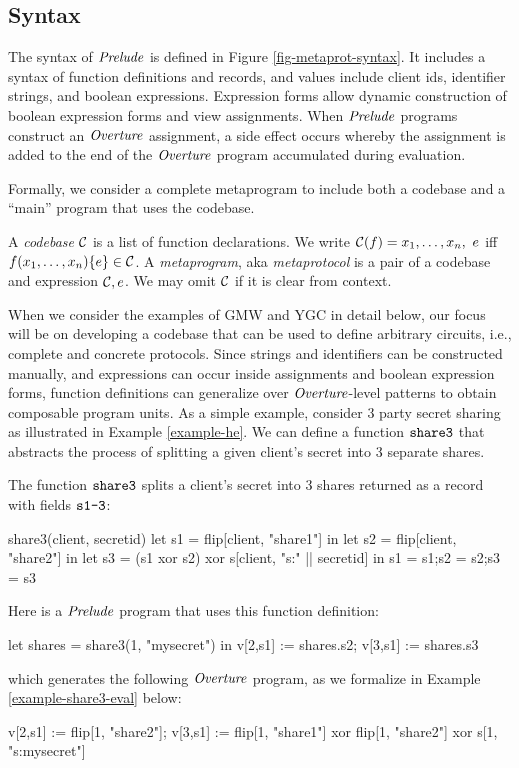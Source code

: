 \subsection{Syntax}

The syntax of $\mathit{Prelude}$ is defined in Figure
\ref{fig-metaprot-syntax}.  It includes a syntax of function
definitions and records, and values include client ids, identifier
strings, and boolean expressions. Expression forms allow dynamic
construction of boolean expression forms and view assignments. When
$\mathit{Prelude}$ programs construct an $\mathit{Overture}$ assignment, a side effect
occurs whereby the assignment is added to the end of the $\mathit{Overture}$
program accumulated during evaluation.

Formally, we consider a complete metaprogram to include both a
codebase and a ``main'' program that uses the codebase. 
\begin{definition}
A \emph{codebase} $\mathcal{C}$ is a list of function 
declarations. We write $ \mathcal{C}(f) = x_1,\ldots,x_n,\ e$
iff $f(x_1,\ldots,x_n) \{ e \} \in \mathcal{C}$.
A \emph{metaprogram}, aka \emph{metaprotocol}  is a pair of a 
codebase and expression $\mathcal{C}, e$. We may omit
$\mathcal{C}$ if it is clear from context.  
\end{definition}

When we consider the examples of GMW and YGC in detail below, our
focus will be on developing a codebase that can be used to define
arbitrary circuits, i.e., complete and concrete protocols. Since
strings and identifiers can be constructed manually, and expressions
can occur inside assignments and boolean expression forms, function
definitions can generalize over $\mathit{Overture}$-level patterns to obtain
composable program units.   As a simple example, consider 3 party secret sharing as
illustrated in Example \ref{example-he}. We can define a function
$\texttt{share3}$ that abstracts the process of splitting a given
client's secret into 3 separate shares.
\begin{example} \label{example-share3} The function $\texttt{share3}$ 
  splits a client's secret into 3 shares returned as a record
  with fields $\texttt{s1-3}$:
  {\small
  \begin{verbatimtab}
      share3(client, secretid) {
        let s1 = flip[client, "share1"] in
        let s2 = flip[client, "share2"] in
        let s3 = (s1 xor s2) xor s[client, "s:" || secretid] in
        {s1 = s1;s2 = s2;s3 = s3}
      } \end{verbatimtab}
  }
  Here is a $\mathit{Prelude}$ program that uses this function definition:
  {\small
    \begin{verbatimtab}
      let shares = share3(1, "mysecret") in
      v[2,s1] := shares.s2;
      v[3,s1] := shares.s3 \end{verbatimtab}
  }
  which generates the following $\mathit{Overture}$ program, as we formalize in Example \ref{example-share3-eval}
  below:
  {\small
  \begin{verbatimtab}
      v[2,s1] := flip[1, "share2"];
      v[3,s1] := flip[1, "share1"] xor flip[1, "share2"] xor s[1, "s:mysecret"] \end{verbatimtab}
  }
\end{example}

